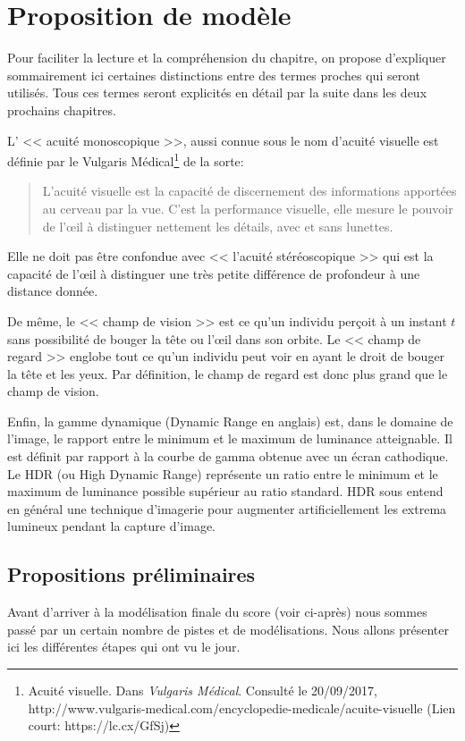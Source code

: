 	\chapter{Proposition de modèle}
	\par Pour faciliter la lecture et la compréhension du chapitre, on propose d'expliquer sommairement ici certaines distinctions entre des termes proches qui seront utilisés. Tous ces termes seront explicités en détail par la suite dans les deux prochains chapitres.

	\par L' << acuité monoscopique >>, aussi connue sous le nom d'acuité visuelle est définie par le Vulgaris Médical\footnote{Acuité visuelle. Dans \textit{Vulgaris Médical}. Consulté le 20/09/2017, http://www.vulgaris-medical.com/encyclopedie-medicale/acuite-visuelle (Lien court: https://lc.cx/GfSj)} de la sorte:
	\begin{quote}
		L'acuité visuelle est la capacité de discernement des informations apportées au cerveau par la vue. C'est la performance visuelle, elle mesure le pouvoir de l'œil à distinguer nettement les détails, avec et sans lunettes.
	\end{quote}
	Elle ne doit pas être confondue avec << l'acuité stéréoscopique >> qui est la capacité de l'œil à distinguer une très petite différence de profondeur à une distance donnée.
	
	\par De même, le << champ de vision >> est ce qu'un individu perçoit à un instant $t$ sans possibilité de bouger la tête ou l'œil dans son orbite. Le << champ de regard >> englobe tout ce qu'un individu peut voir en ayant le droit de bouger la tête et les yeux. Par définition, le champ de regard est donc plus grand que le champ de vision.
	
	\par Enfin, la gamme dynamique (Dynamic Range en anglais) est, dans le domaine de l'image, le rapport entre le minimum et le maximum de luminance atteignable. Il est définit par rapport à la courbe de gamma obtenue avec un écran cathodique. Le HDR (ou High Dynamic Range) représente un ratio entre le minimum et le maximum de luminance possible supérieur au ratio standard. HDR sous entend en général une technique d'imagerie pour augmenter artificiellement les extrema lumineux pendant la capture d'image.
	
	\section{Propositions préliminaires}	
	\par Avant d'arriver à la modélisation finale du score (voir ci-après) nous sommes passé par un certain nombre de pistes et de modélisations. Nous allons présenter ici les différentes étapes qui ont vu le jour.
	
